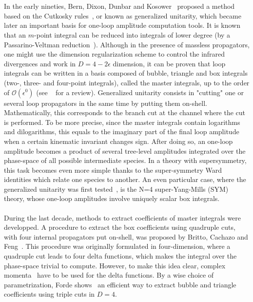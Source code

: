 \\\\
In the early nineties, Bern, Dixon, Dunbar and Kosower~\cite{Bern:1994zx} proposed a method based on the Cutkosky rules~\cite{doi:10.1063/1.1703676}, or known as generalized unitarity, which became later an important basis for one-loop amplitude computation tools.
It is known that an $m$-point integral can be reduced into integrals of lower degree (\eg by a Passarino-Veltman reduction~\cite{PASSARINO1979151}).
Although in the presence of massless propagators, one might use the dimension regularization scheme to control the infrared divergences and work in $D = 4-2\epsilon$ dimension, it can be proven that loop integrals can be written in a basis composed of bubble, triangle and box integrals (\ie two-, three- and four-point integrals), called the master integrals, up to the order of $\mathcal{O}(\epsilon^0)$ (see \eg~\cite{Gluza:2010ws} for a review).
Generalized unitarity consists in "cutting" one or several loop propagators in the same time by putting them on-shell.
Mathematically, this corresponds to the branch cut at the channel where the cut is performed. 
To be more precise, since the master integrals contain logarithms and dilogarithms, this equals to the imaginary part of the final loop amplitude when a certain kinematic invariant changes sign.
After doing so, an one-loop amplitude becomes a product of several tree-level amplitudes integrated over the phase-space of all possible intermediate species.
In a theory with supersymmetry, this task becomes even more simple thanks to the super-symmetry Ward identities which relate one species to another.
An even particular case, where the generalized unitarity was first tested~\cite{Bern:1994zx}, is the N=4 super-Yang-Mills (SYM) theory, whose one-loop amplitudes involve uniquely scalar box integrals. 
\\\\
During the last decade, methods to extract coefficients of master integrals were developped. 
A procedure to extract the box coefficients using quadruple cuts, \ie with four internal propagators put on-shell, was proposed by Britto, Cachazo and Feng~\cite{Britto:2004nc}. 
This procedure was originally formulated in four-dimension, where a quadruple cut leads to four delta functions, which makes the integral over the phase-space trivial to compute. 
However, to make this idea clear, complex momenta~\cite{PhysRevD.75.025028} have to be used for the delta functions.
By a wise choice of parametrization, Forde shows~\cite{Forde:2007mi} an efficient way to extract bubble and triangle coefficients using triple cuts in $D=4$.
